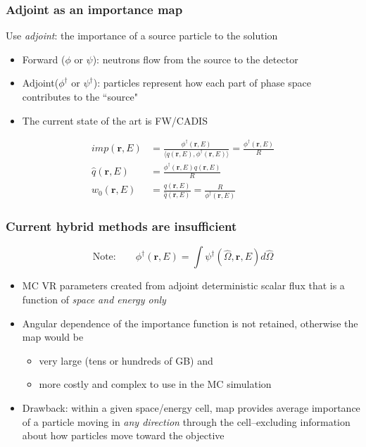\documentclass[handout]{beamer}
\renewcommand{\(}{\begin{columns}}
\renewcommand{\)}{\end{columns}}
\newcommand{\<}[1]{\begin{column}{#1}}
\renewcommand{\>}{\end{column}}
\newcommand{\vOmega}{\ensuremath{\hat{\Omega}}}
\newcommand{\ve}[1]{\ensuremath{\mathbf{#1}}}
\begin{document}
\begin{frame}[fragile]
  \frametitle{Adjoint as an importance map}
Use \textit{adjoint}: the importance of a source particle to the solution

\begin{itemize}
\item Forward ($\phi$ or $\psi$): neutrons flow from the source to the detector
\item Adjoint($\phi^{\dagger}$ or $\psi^{\dagger}$): particles represent how each part of phase space contributes to the ``source"
\item The current state of the art is FW/CADIS \cite{Wagner2007}
\end{itemize}
\begin{align*}
  imp(\ve{r}, E) &= \frac{\phi^{\dagger}(\ve{r}, E)}{\langle q(\ve{r}, E), \phi^{\dagger}(\ve{r}, E) \rangle} = \frac{\phi^{\dagger}(\ve{r}, E)}{R} \\
  \hat{q}(\ve{r}, E) &= \frac{\phi^{\dagger}(\ve{r}, E) q(\ve{r}, E)}{R} \\
  w_0(\ve{r}, E) &= \frac{q(\ve{r}, E)}{\hat{q}(\ve{r}, E)} = \frac{R}{\phi^{\dagger}(\ve{r}, E)} 
\end{align*}

\end{frame}


\begin{frame}[fragile]
  \frametitle{Current hybrid methods are insufficient}

\[\text{Note:}\qquad\phi^{\dagger}(\ve{r},E) = \int \psi^{\dagger}(\vOmega, 
		\ve{r},E) d\vOmega\]

	\begin{itemize}
	\item MC VR parameters created from adjoint deterministic scalar flux that is a function of \textit{space and energy only} \vspace*{1 em}
	\pause
	\item Angular dependence of the importance function is not retained, otherwise the map would be 
	\begin{itemize}
	  \item very large (tens or hundreds of GB) and
	  \item more costly and complex to use in the MC simulation 
	\end{itemize}
	\pause
	\item Drawback: within a given space/energy cell, map provides average importance of a particle moving in \textit{any direction} through the cell--excluding information about how particles move \alert{toward the objective}
	\end{itemize}

\end{frame}
\end{document}
